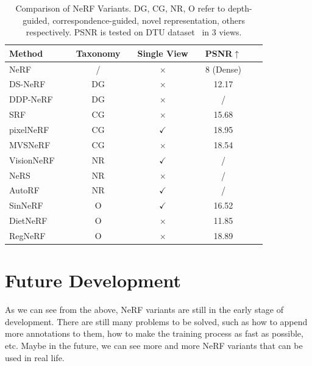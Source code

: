 \documentclass[10pt,twocolumn,letterpaper]{article}
\begin{document}
\begin{table}[t]
   \centering
   \begin{tabular}{@{}lc@{}c@{}lc@{}lc@{}lc}
     \hline
     Method && Taxonomy && Single View && PSNR$\uparrow$\\
     \hline
     NeRF~\cite{mildenhall2020nerf} && / && $\times$ && 8 (Dense)\\
     DS-NeRF~\cite{kangle2021dsnerf} && DG && $\times$ && 12.17\\
     DDP-NeRF~\cite{Roessle_2022_CVPR} && DG && $\times$ && / \\
     SRF~\cite{SRF} && CG && $\times$ && 15.68 \\
     pixelNeRF~\cite{yu2020pixelnerf} && CG && $\checkmark$ && 18.95\\
     MVSNeRF~\cite{mvsnerf} && CG && $\times$ && 18.54\\
     VisionNeRF~\cite{lin2023visionnerf} && NR && $\checkmark$ && / \\
     NeRS~\cite{zhang2021ners} && NR && $\times$ && / \\
     AutoRF~\cite{mueller2022autorf} && NR && $\checkmark$ && / \\
     SinNeRF~\cite{Xu_2022_SinNeRF} && O && $\checkmark$ && 16.52\\
     DietNeRF~\cite{Jain_2021_ICCV} && O && $\times$ && 11.85\\
     RegNeRF~\cite{Niemeyer2021Regnerf} && O && $\times$ && 18.89\\
     \hline
   \end{tabular}
   \vspace{2mm}
   \caption{Comparison of NeRF Variants. DG, CG, NR, O refer to depth-guided, correspondence-guided, novel representation, others respectively. PSNR is tested on DTU dataset~\cite{6909453} in 3 views.}
   \label{tab:relation}
   \vspace{-2mm}
\end{table}

\section{Future Development}

As we can see from the above, NeRF variants are still in the early stage of development. There are still many problems to be solved, such as how to append more annotations to them, how to make the training process as fast as possible, etc. Maybe in the future, we can see more and more NeRF variants that can be used in real life.

\newpage
{\small


}
\end{document}
